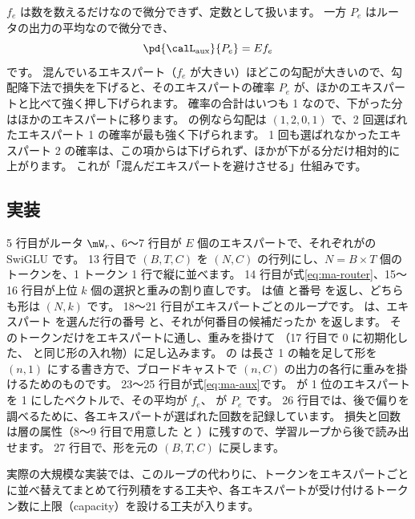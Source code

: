 $f_e$ は数を数えるだけなので微分できず、定数として扱います。
一方 $P_e$ はルータの出力の平均なので微分でき、
\[
\pd{\calL_{\mathrm{aux}}}{P_e}=E f_e
\]
です。
混んでいるエキスパート（$f_e$ が大きい）ほどこの勾配が大きいので、勾配降下法で損失を下げると、そのエキスパートの確率 $P_e$ が、ほかのエキスパートと比べて強く押し下げられます。
確率の合計はいつも 1 なので、下がった分はほかのエキスパートに移ります。
の例なら勾配は $(1,2,0,1)$ で、2 回選ばれたエキスパート 1 の確率が最も強く下げられます。
1 回も選ばれなかったエキスパート 2 の確率は、この項からは下げられず、ほかが下がる分だけ相対的に上がります。
これが「混んだエキスパートを避けさせる」仕組みです。

\subsection*{実装}


5 行目がルータ $\mW_r$、6〜7 行目が $E$ 個のエキスパートで、それぞれがの SwiGLU です。
13 行目で $(B,T,C)$ を $(N,C)$ の行列にし、$N=B\times T$ 個のトークンを、1 トークン 1 行で縦に並べます。
14 行目が式\eqref{eq:ma-router}、15〜16 行目が上位 $k$ 個の選択と重みの割り直しです。
 は値  と番号  を返し、どちらも形は $(N,k)$ です。
18〜21 行目がエキスパートごとのループです。
 は、エキスパート  を選んだ行の番号  と、それが何番目の候補だったか  を返します。
そのトークンだけをエキスパートに通し、重みを掛けて （17 行目で 0 に初期化した、 と同じ形の入れ物）に足し込みます。
 の  は長さ 1 の軸を足して形を $(n,1)$ にする書き方で、ブロードキャストで $(n,C)$ の出力の各行に重みを掛けるためのものです。
23〜25 行目が式\eqref{eq:ma-aux}です。
 が 1 位のエキスパートを 1 にしたベクトルで、その平均が $f_e$、 が $P_e$ です。
26 行目では、後で偏りを調べるために、各エキスパートが選ばれた回数を記録しています。
損失と回数は層の属性（8〜9 行目で用意した  と ）に残すので、学習ループから後で読み出せます。
27 行目で、形を元の $(B,T,C)$ に戻します。

実際の大規模な実装では、このループの代わりに、トークンをエキスパートごとに並べ替えてまとめて行列積をする工夫や、各エキスパートが受け付けるトークン数に上限（capacity）を設ける工夫が入ります。

